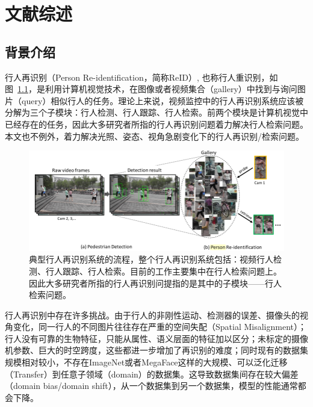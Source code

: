
\chapter{文献综述}

\section{背景介绍}

\indent 行人再识别（Person Re-identification，简称ReID）, 也称行人重识别\cite{zheng2016person}，如图~\ref{figure:background}，是利用计算机视觉技术，在图像或者视频集合（gallery）中找到与询问图片（query）相似行人的任务。理论上来说，视频监控中的行人再识别系统应该被分解为三个子模块：行人检测、行人跟踪、行人检索。前两个模块是计算机视觉中已经存在的任务，因此大多研究者所指的行人再识别问题着力解决行人检索问题\cite{zheng2017person}。本文也不例外，着力解决光照、姿态、视角急剧变化下的行人再识别/检索问题。

\begin{figure}
	\centering
	\captionsetup{width=.88\linewidth}
	\includegraphics[width=\linewidth,keepaspectratio]{data/kaitibaogao/background.png}
	\caption{\kaiti 典型行人再识别系统的流程，整个行人再识别系统包括：视频行人检测、行人跟踪、行人检索。目前的工作主要集中在行人检索问题上。因此大多研究者所指的行人再识别问提指的是其中的子模块——行人检索问题。}
	\label{figure:background}
\end{figure}

行人再识别中存在许多挑战。由于行人的非刚性运动、检测器的误差、摄像头的视角变化，同一行人的不同图片往往存在严重的空间失配（Spatial Misalignment）；行人没有可靠的生物特征，只能从属性、语义层面的特征加以区分；未标定的摄像机参数、巨大的时空跨度，这些都进一步增加了再识别的难度；同时现有的数据集规模相对较小，不存在ImageNet或者MegaFace这样的大规模、可以泛化迁移（Transfer）到任意子领域（domain）的数据集。这导致数据集间存在较大偏差（domain bias/domain shift），从一个数据集到另一个数据集，模型的性能通常都会下降。

